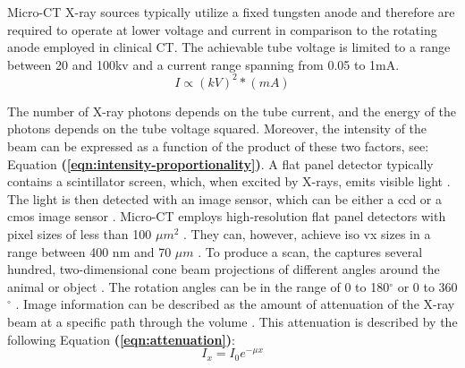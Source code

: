 \noindent
Micro-CT X-ray sources typically utilize a fixed tungsten anode
and therefore are required to operate at lower voltage and current in comparison to the rotating anode employed in clinical CT.
The achievable tube voltage is limited to a range between 20 and 100\acrshort{kv} and a current range spanning from 0.05 to 1mA.
\begin{equation}\label{eqn:intensity-proportionality}
	I \propto (kV)^{2}*(mA)
\end{equation}

\noindent
The number of X-ray photons depends on the tube current, and the energy of the photons depends on the tube voltage squared.
Moreover, the intensity of the beam can be expressed as a function of the product of these two factors,
see: Equation \textbf{(\ref{eqn:intensity-proportionality})}.
A flat panel detector typically contains a scintillator screen, which, when excited by X-rays, emits visible light \cite{babaComparisonFlatpanelDetector2002,ritmanCurrentStatusDevelopments2011,clarkMicroCTRodentsStateart2014}.
The light is then detected with an image sensor, which can be either a \acrfull{ccd} or a \acrfull{cmos} image sensor \cite{babaComparisonFlatpanelDetector2002}.
Micro-CT employs high-resolution flat panel detectors with pixel sizes of less than 100 $\mu m^{2}$ \cite{clarkAdvancesMicroCTImaging2021,clarkMicroCTRodentsStateart2014}.
They can, however, achieve \gls{iso} \gls{vx} sizes in a range between 400 nm and 70 $\mu m$ \cite{orhanMicrocomputedTomographyMicroCT2020}.
To produce a scan, the \mct\space captures several hundred, two-dimensional cone beam projections of different angles around the animal or object \cite{clarkMicroCTRodentsStateart2014,ritmanCurrentStatusDevelopments2011,clarkAdvancesMicroCTImaging2021}.
The rotation angles can be in the range of 0 to 180$^{\circ}$ or 0 to 360$^{\circ}$ \cite{orhanMicrocomputedTomographyMicroCT2020}.
Image information can be described as the amount of attenuation of the X-ray beam at a specific path through the volume \cite{orhanMicrocomputedTomographyMicroCT2020}.
This attenuation is described by the following Equation \textbf{(\ref{eqn:attenuation})}:
\begin{equation}\label{eqn:attenuation}
	I_{x} = I_{0}e^{- \mu x}
\end{equation}

